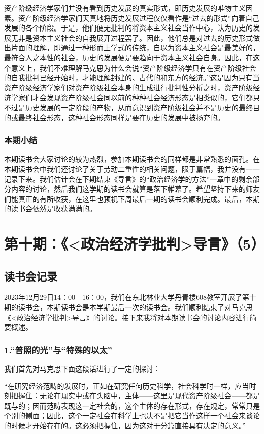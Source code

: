 \documentclass[a4paper,twoside,12pt,AutoFakeBold]{ctexart}
\begin{document}
资产阶级经济学家们并没有看到历史发展的真实形式，即历史发展的唯物主义因素。资产阶级经济学家们天真地将历史发展过程仅仅看作是“过去的形式”向着自己发展的各个阶段。于是，他们便无批判的将资本主义社会当作中心，认为历史的发展无非是资本主义社会的自我展开过程罢了。因此，他们总是对过去的历史形式做出片面的理解，即通过一种形而上学式的传统，自以为资本主义社会是最美好的，最符合人之本性的社会，历史的发展便是要趋向于资本主义社会自身。因此，在这个意义上，我们不难理解马克思为什么会说“资产阶级经济学只有在资产阶级社会的自我批判已经开始时，才能理解封建的、古代的和东方的经济。”这是因为只有当资产阶级经济学家们对资产阶级社会本身的生成进行批判性分析之时，资产阶级经济学家们才会发现资产阶级社会同以前的种种社会经济形态是相类似的，它们都只不过是历史发展的一定阶段的产物，从而意识到资产阶级社会并不是历史的最终目的或最终社会形态，这种社会形态同样是要在历史的发展中被扬弃的。
\subsubsection{本期小结}

本期读书会大家讨论的较为热烈，参加本期读书会的同样都是非常熟悉的面孔。在本期读书会中我们还讨论了关于劳动二重性的相关问题，限于篇幅，我并没有一一记录下来。我们估计会在下期结束《导言》的“政治经济学的方法”一章中的剩余部分内容的讨论，然后我们这学期的读书会就算是落下帷幕了。希望坚持下来的师友们能真正的有所收获，在这里也预祝下周最后一期的读书会顺利完成。最后，本期的读书会依然是收获满满的。
\newpage
\section{第十期：《<政治经济学批判>导言》（5）}
\subsection{读书会记录}
2023年12月29日14：00—16：00，我们在东北林业大学丹青楼608教室开展了第十期的读书会，本期读书会是本学期最后一次的读书会。我们顺利结束了对马克思《<政治经济学批判>导言》的讨论。接下来我将对本期读书会的讨论内容进行简要概述。
\subsubsection{1.“普照的光”与“特殊的以太”}
我们首先对马克思下面这段话进行了一定的探讨：

\begin{adjustwidth}{2em}{2em}
    \qquad\fangsong
    “在研究经济范畴的发展时，正如在研究任何历史科学，社会科学时一样，应当时刻把握住：无论在现实中或在头脑中，主体——这里是现代资产阶级社会——都是既与的；因而范畴表现这一定社会的，这个主体的存在形式，存在规定，常常只是个别的侧面；因此，这个一定社会在科学上也决不是把它当作这样一个社会来谈论的时候才开始存在的。这必须把握住，因为这对于分篇直接具有决定的意义。”
\end{adjustwidth}
\end{document}

